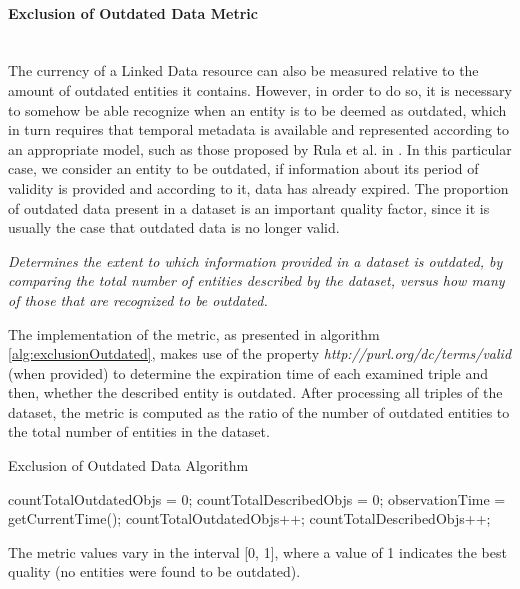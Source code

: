 
\paragraph{Exclusion of Outdated Data Metric} ~\\ %
The currency of a Linked Data resource can also be measured relative to the amount of outdated entities it contains. However, in order to do so, it is necessary to somehow be able recognize when an entity is to be deemed as outdated, which in turn requires that temporal metadata is available and represented according to an appropriate model, such as those proposed by Rula et al. in \cite{Rula2012A}. In this particular case, we consider an entity to be outdated, if information about its period of validity is provided and according to it, data has already expired. The proportion of outdated data present in a dataset is an important quality factor, since it is usually the case that outdated data is no longer valid.
\begin{mdframed}[style=metricdefinition]
\emph{Determines the extent to which information provided in a dataset is outdated, by comparing the total number of entities described by the dataset, versus how many of those that are recognized to be outdated.}
\end{mdframed}

The implementation of the metric, as presented in algorithm \ref{alg:exclusionOutdated}, makes use of the property \textit{http://purl.org/dc/terms/valid} (when provided) to determine the expiration time of each examined triple and then, whether the described entity is outdated. After processing all triples of the dataset, the metric is computed as the ratio of the number of outdated entities to the total number of entities in the dataset.
\begin{algorithm}
\caption{Exclusion of Outdated Data Algorithm} \label{alg:exclusionOutdated}
\begin{algorithmic}[1]
\State countTotalOutdatedObjs = 0;
\State countTotalDescribedObjs = 0;
\State observationTime = getCurrentTime();
\EndProcedure
{}
\State countTotalOutdatedObjs++;
\EndIf
\EndIf
{} 
\State countTotalDescribedObjs++;
\EndIf ~\\
\EndProcedure
\end{algorithmic}
\end{algorithm}
The metric values vary in the interval [0, 1], where a value of 1 indicates the best quality (no entities were found to be outdated).


